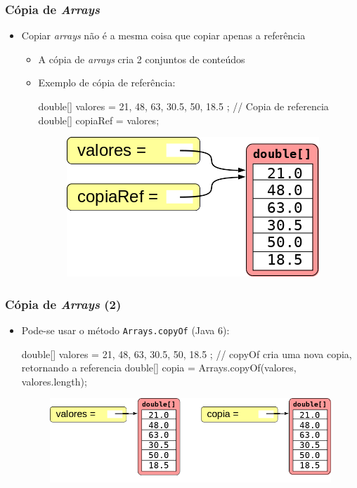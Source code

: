 \documentclass[xcolor={dvipsnames,table},aspectratio=169]{beamer}
\begin{document}
\begin{frame}[fragile]\frametitle{Cópia de \emph{Arrays}}
\begin{itemize}
	\item Copiar \emph{arrays} não é a mesma coisa que copiar apenas a referência
	\begin{itemize}
		\item A cópia de \emph{arrays} cria 2 conjuntos de conteúdos
		\item Exemplo de cópia de referência:
\begin{javacode}
double[] valores = { 21, 48, 63, 30.5, 50, 18.5 };
// Copia de referencia
double[] copiaRef = valores;
\end{javacode}
\begin{figure}[h]
	\includegraphics[height=0.30\paperheight,center]{pucrs-ep-fprog-unidade_06-arrays-laminas-copia_1.png}
\end{figure}
	\end{itemize}
\end{itemize}
\end{frame}

\begin{frame}[fragile]\frametitle{Cópia de \emph{Arrays} (2)}
\begin{itemize}
	\item Pode-se usar o método \texttt{Arrays.copyOf} (Java 6):
\begin{javacode}
double[] valores = { 21, 48, 63, 30.5, 50, 18.5 };
// copyOf cria uma nova copia, retornando a referencia
double[] copia = Arrays.copyOf(valores, valores.length);
\end{javacode}
\begin{figure}[h]
	\includegraphics[height=0.30\paperheight,center]{pucrs-ep-fprog-unidade_06-arrays-laminas-copia_2.png}
\end{figure}
\end{itemize}
\end{frame}
\end{document}

